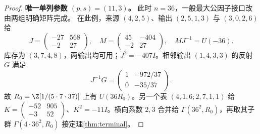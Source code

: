 \begin{proof}
\par\noindent\textbf{唯一单列参数 $(p,s)=(11,3)$。}
此时 $n=36$，一般最大公因子接口改由两组明确矩阵完成。
在此例，来源 $(4,2,5)$、输出 $(2,5,1,3)$ 与 $(3,0,2,6)$ 给
\[
J=\begin{pmatrix}-27&568\\-2&27\end{pmatrix},\quad
M=\begin{pmatrix}45&-404\\-2&27\end{pmatrix},\quad MJ^{-1}=U(-36).
\]
库存为 $(3,7,4,8)$，两输出均可用；$J^2=-407I$。相邻输出 $(1,4,3,3)$ 的反射 $G$ 满足
\[J^{-1}G=\begin{pmatrix}1&-972/37\\0&-35/37\end{pmatrix}.
\]
故 $R_0=\Z[1/(5\cdot7\cdot37)]$ 上有 $U(36R_0)$。另一个表 $(4,1,6;2,7,1,1)$ 给 $K=\left(\begin{smallmatrix}-52&905\\-3&52\end{smallmatrix}\right)$、$K^2=-11I$。横向系数 $2,3$ 合并给 $\Gamma(36^2,R_0)$，再取其子群 $\Gamma(4\cdot36^2,R_0)$ 接定理\ref{thm:terminal}。
\end{proof}

